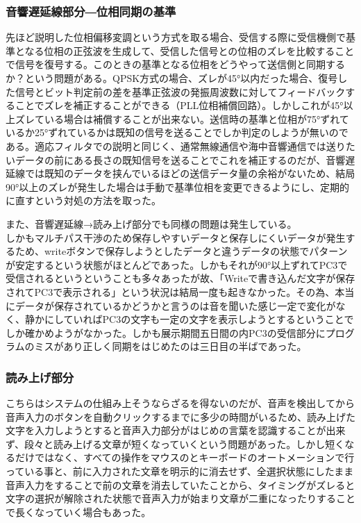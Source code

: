 \documentclass[a4paper,report]{jsbook}
\begin{document}
\subsubsection{音響遅延線部分―位相同期の基準}\label{ux97f3ux97ffux9045ux5ef6ux7ddaux90e8ux5206ux4f4dux76f8ux540cux671fux306eux57faux6e96}

先ほど説明した位相偏移変調という方式を取る場合、受信する際に受信機側で基準となる位相の正弦波を生成して、受信した信号との位相のズレを比較することで信号を復号する。このときの基準となる位相をどうやって送信側と同期するか？という問題がある。QPSK方式の場合、ズレが45°以内だった場合、復号した信号とビット判定前の差を基準正弦波の発振周波数に対してフィードバックすることでズレを補正することができる（PLL位相補償回路）。しかしこれが45°以上ズレている場合は補償することが出来ない。送信時の基準と位相が75°ずれているか25°ずれているかは既知の信号を送ることでしか判定のしようが無いのである。適応フィルタでの説明と同じく、通常無線通信や海中音響通信では送りたいデータの前にある長さの既知信号を送ることでこれを補正するのだが、音響遅延線では既知のデータを挟んでいるほどの送信データ量の余裕がないため、結局90°以上のズレが発生した場合は手動で基準位相を変更できるようにし、定期的に直すという対処の方法を取った。

また、音響遅延線→読み上げ部分でも同様の問題は発生している。\\
しかもマルチパス干渉のため保存しやすいデータと保存しにくいデータが発生するため、writeボタンで保存しようとしたデータと違うデータの状態でパターンが安定するという状態がほとんどであった。しかもそれが90°以上ずれてPC3で受信されるというということも多々あったが故、「Writeで書き込んだ文字が保存されてPC3で表示される」という状況は結局一度も起きなかった。その為、本当にデータが保存されているかどうかと言うのは音を聞いた感じ一定で変化がなく、静かにしていればPC3の文字も一定の文字を表示しようとするということでしか確かめようがなかった。しかも展示期間五日間の内PC3の受信部分にプログラムのミスがあり正しく同期をはじめたのは三日目の半ばであった。

\subsubsection{読み上げ部分}\label{ux8aadux307fux4e0aux3052ux90e8ux5206}

こちらはシステムの仕組み上そうならざるを得ないのだが、音声を検出してから音声入力のボタンを自動クリックするまでに多少の時間がいるため、読み上げた文字を入力しようとすると音声入力部分がはじめの言葉を認識することが出来ず、段々と読み上げる文章が短くなっていくという問題があった。しかし短くなるだけではなく、すべての操作をマウスのとキーボードのオートメーションで行っている事と、前に入力された文章を明示的に消去せず、全選択状態にしたまま音声入力をすることで前の文章を消去していたことから、タイミングがズレると文字の選択が解除された状態で音声入力が始まり文章が二重になったりすることで長くなっていく場合もあった。
\end{document}
